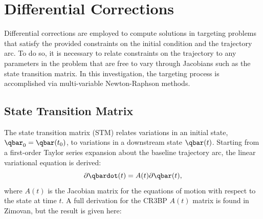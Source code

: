 \section{Differential Corrections}\label{sec:DifferentialCorrections}
Differential corrections are employed to compute solutions in targeting problems that satisfy the
provided constraints on the initial condition and the trajectory arc. To do so, it is necessary to
relate constraints on the trajectory to any parameters in the problem that are free to vary through
Jacobians such as the state transition matrix. In this investigation, the targeting process is
accomplished via multi-variable Newton-Raphson methods.

\subsection{State Transition Matrix}
The state transition matrix (STM) relates variations in an initial state, $\qbar_{0}=\qbar(t_{0})$,
to variations in a downstream state $\qbar(t)$. Starting from a first-order Taylor series expansion
about the baseline trajectory arc, the linear variational equation is derived:
\begin{equation}
    \partial\qbardot(t)=A(t)\partial\qbar(t),
    \label{eq:linearvariational}
\end{equation}
where $A(t)$ is the Jacobian matrix for the equations of motion with respect to the state at time
$t$. A full derivation for the CR3BP $A(t)$ matrix is found in Zimovan, but the result is given
here\cite{Zimovan:2017}:
\vfill
